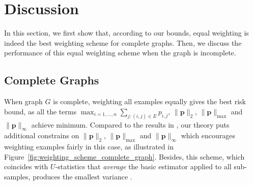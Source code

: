 \documentclass[letterpaper]{article} %
\newcommand{\probdistri}{\mathbf{p}}
\newcommand{\pair}[1]{(#1)}
\newcommand{\citep}[3]{(#1\ \citeauthor{#3}\ \citeyear{#3},\ #2)}
\begin{document}


\section{Discussion} %
\label{sec:discussion}
In this section, we first show that, according to our bounds, equal weighting is indeed the best weighting scheme for complete graphs. 
Then, we discuss the performance of this equal weighting scheme when the graph is incomplete. %

\subsection{Complete Graphs} %
\label{sub:complete_graph}
When graph $G$ is complete, weighting all examples equally gives the best risk bound, as all the terms $\max_{i=1,\dots,n} \sum_{j:\pair{i,j}\in E} p_{i,j}$, $\|\probdistri{}\|_2$, $\|\probdistri{}\|_\max$ and $\|\probdistri{}\|_\infty$ achieve minimum. 
Compared to the results in \cite{wang2017learning}, our theory puts additional constrains on $\|\probdistri{}\|_2$, $\|\probdistri{}\|_\max$ and $\|\probdistri{}\|_\infty$ which encourages weighting examples fairly in this case, as illustrated in Figure~\ref{fig:weighting_scheme_complete_graph}. 
Besides, this scheme, which coincides with $U$-statistics that \emph{average} the basic estimator applied to all sub-samples, produces the smallest variance \cite{hoeffding1948class}. 
\end{document}
